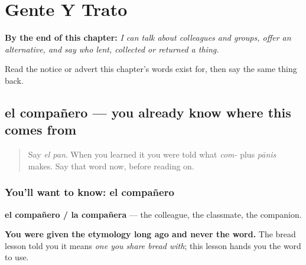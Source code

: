 
\chapter{Gente Y Trato}
\label{ch:es-gente}

\begin{chapteropening}
\textbf{By the end of this chapter:} \emph{I can talk about colleagues and groups, offer an alternative, and say who lent, collected or returned a thing.}

Read the notice or advert this chapter's words exist for, then say the same thing back.
\end{chapteropening}

\section[el compañero]{el compañero — you already know where this comes from}

\label{lesson:ES-C436-companero}



\begin{quote}
Say \emph{el pan}. When you learned it you were told what \emph{com-} plus \emph{pānis} makes. Say that word now, before reading on.
\end{quote}

\subsection*{You'll want to know: el compañero}
\textbf{el compañero / la compañera} — the colleague, the classmate, the companion.

\textbf{You were given the etymology long ago and never the word.} The bread lesson told you it means \emph{one you share bread with}; this lesson hands you the word to use.

